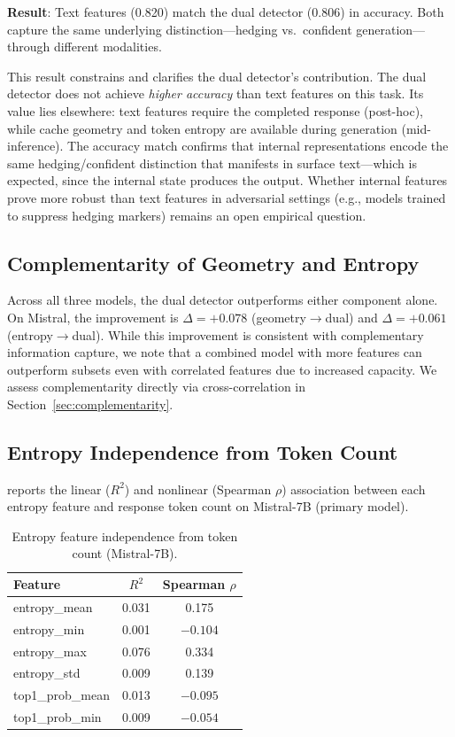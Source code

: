 \documentclass[11pt,a4paper]{article}
\begin{document}
\textbf{Result}: Text features (0.820) match the dual detector (0.806) in accuracy. Both capture the same underlying distinction---hedging vs.\ confident generation---through different modalities.

This result constrains and clarifies the dual detector's contribution. The dual detector does not achieve \emph{higher accuracy} than text features on this task. Its value lies elsewhere: text features require the completed response (post-hoc), while cache geometry and token entropy are available during generation (mid-inference). The accuracy match confirms that internal representations encode the same hedging/confident distinction that manifests in surface text---which is expected, since the internal state produces the output. Whether internal features prove more robust than text features in adversarial settings (e.g., models trained to suppress hedging markers) remains an open empirical question.

\subsection{Complementarity of Geometry and Entropy}

Across all three models, the dual detector outperforms either component alone. On Mistral, the improvement is $\Delta = +0.078$ (geometry$\to$dual) and $\Delta = +0.061$ (entropy$\to$dual). While this improvement is consistent with complementary information capture, we note that a combined model with more features can outperform subsets even with correlated features due to increased capacity. We assess complementarity directly via cross-correlation in Section~\ref{sec:complementarity}.

\subsection{Entropy Independence from Token Count}

 reports the linear ($R^2$) and nonlinear (Spearman $\rho$) association between each entropy feature and response token count on Mistral-7B (primary model).

\begin{table}[H]
\centering
\caption{Entropy feature independence from token count (Mistral-7B).}
\label{tab:entropy_indep}
\begin{tabular}{lcc}
\toprule
\textbf{Feature} & \textbf{$R^2$} & \textbf{Spearman $\rho$} \\
\midrule
entropy\_mean & 0.031 & 0.175 \\
entropy\_min & 0.001 & $-0.104$ \\
entropy\_max & 0.076 & 0.334 \\
entropy\_std & 0.009 & 0.139 \\
top1\_prob\_mean & 0.013 & $-0.095$ \\
top1\_prob\_min & 0.009 & $-0.054$ \\
\bottomrule
\end{tabular}
\end{table}
\end{document}

